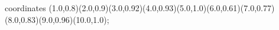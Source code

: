 					coordinates { (1.0,0.8)(2.0,0.9)(3.0,0.92)(4.0,0.93)(5.0,1.0)(6.0,0.61)(7.0,0.77)(8.0,0.83)(9.0,0.96)(10.0,1.0)};